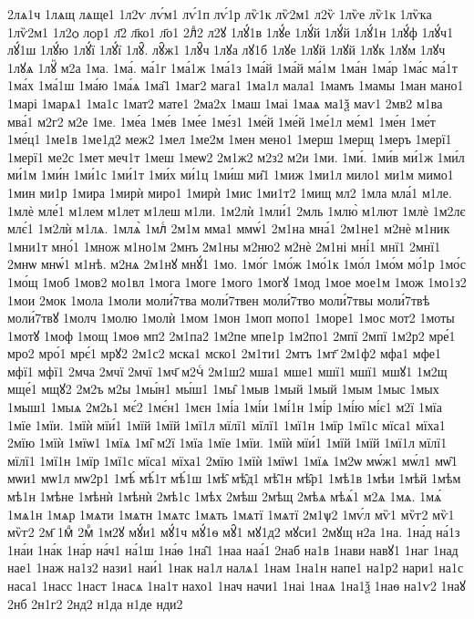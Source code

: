 {2лѧ1ч
1лѧщ
лѧще1
1л2ѵ
лѵ́м1
лѵ́1п
лѵ́1р
лѷ1к
лѷ2м1
л2ѷ
1лѷе
лѷ1к
1лѷка
1лѷ2м1
1л2ѻ
лѻр1
л҃2
л҃ко1
л҃о1
2лⷣ2
л2ꙋ
1лꙋ́1в
1лꙋ́е
1лꙋ́й
1лꙋ́й
1лꙋ́1н
1лꙋ́ф
1лꙋ́ч1
лꙋ́1ш
1лꙋ́ю
1лꙋ́ї
1лꙋ́ї
1лꙋ̑.
лꙋ̑ж1
1лꙋ̑ч
1лꙋа
лꙋ1б
1лꙋе
1лꙋй
1лꙋй
1лꙋк
1лꙋм
1лꙋч
1лꙋѧ
1лꙋⷩ
м2а
1ма.
1ма́.
ма́1г
1ма́1ж
1ма́1з
1ма́й
1ма́й
ма́1м
1ма́н
1ма́р
1ма́с
ма́1т
1ма́х
1ма́1ш
1ма́ю
1ма́ѧ
1ма̑1
1маг2
мага1
1ма1л
мала1
1мамъ
1мамы
1ман
мано1
1марі
1марѧ1
1ма1с
1мат2
мате1
2ма2х
1маш
1маі
1маѧ
ма1ѯ
маѵ1
2мв2
м1ва
мва́1
м2г2
м2е
1ме.
1ме́а
1ме́в
1ме́е
1ме́з1
1ме́й
1ме́й
1ме́1л
ме́м1
1ме́н
1ме́т
1ме́ц1
1ме1в
1ме1д2
меж2
1мел
1ме2м
1мен
мено1
1мерш
1мерщ
1меръ
1мерї1
1мерї1
ме2с
1мет
меч1т
1меш
1меѡ2
2м1ж2
м2з2
м2и
1ми.
1ми́.
1ми́в
ми́1ж
1ми́л
ми́1м
1ми́н
1ми́1с
1ми́1т
1ми́х
ми́1ц
1ми́ш
ми̑1
1миж
1ми1л
мило1
ми1м
мимо1
1мин
ми1р
1мира
1мирѝ
миро1
1мирѝ
1мис
1ми1т2
1мищ
мл2
1мла
мла́1
м1ле.
1млѐ
мле́1
м1лем
м1лет
м1леш
м1ли.
1м2лѝ
1мли́1
2мль
1млю̀
м1лют
1млѐ
1м2лє
млє́1
1м2лѝ
м1лѧ.
1млѧ̀
1млⷭ
2м1м
мма1
ммѡ́1
2м1на
мна́1
2м1не1
м2нѐ
м1ник
1мни1т
мно́1
1множ
м1но1м
2мнъ
2м1ны
м2ню2
м2нѐ
2м1ні
мні́1
мнї1
2мнї1
2мнѡ
мнѡ́1
м1нѣ.
м2нѧ
2м1нꙋ
мнꙋ́1
1мо.
1мо́г
1мо́ж
1мо́1к
1мо́л
1мо́м
мо́1р
1мо́с
1мо́щ
1моб
1мов2
мо1вл
1мога
1моге
1мого
1могꙋ
1мод
1мое
мое1м
1мож
1мо1з2
1мои
2мок
1мола
1моли
моли́7тва
моли́7твен
моли́7тво
моли́7твы
моли́7твѣ
моли́7твꙋ
1молч
1молю
1молѝ
1мом
1мон
1моп
мопо1
1море1
1мос
мот2
1моты
1мотꙋ
1моф
1мощ
1моѳ
мп2
2м1па2
1м2пе
мпе1р
1м2по1
2мпї
2мпї
1м2р2
мре́1
мро2
мро́1
мрє́1
мрꙋ2
2м1с2
мска1
мско1
2м1ти1
2мтъ
1мт҃
2м1ф2
мфа1
мфе1
мфї1
мфї1
2мча
2мчї
2мчї
1мч҃
м2чⷭ
2м1ш2
мша1
мше1
мшї1
мшї1
мшꙋ1
1м2щ
мще́1
мщꙋ2
2м2ъ
м2ы
1мы́н1
мы́ш1
1мы̑
1мыв
1мый
1мый
1мым
1мыс
1мых
1мыш1
1мыѧ
2м2ь1
мє́2
1мє́н1
1мєн
1мі́а
1мі́и
1мі́1н
1мі́р
1мі́ю
мі́є1
м2ї
1мїа
1мїе
1мїи.
1мїѝ
мїи́1
1мїй
1мїй
1мї1л
мїлї1
мїлї1
1мї1н
1мїр
1мї1с
мїса1
мїха1
2мїю
1мїѝ
1мїѡ1
1мїѧ
1мі̑
м2ї
1мїа
1мїе
1мїи.
1мїѝ
мїи́1
1мїй
1мїй
1мї1л
мїлї1
мїлї1
1мї1н
1мїр
1мї1с
мїса1
мїха1
2мїю
1мїѝ
1мїѡ1
1мїѧ
1м2ѡ
мѡ́ж1
мѡ́л1
мѡ̑1
мѡи1
мѡ1л
мѡ2р1
1мѣ́
мѣ́1т
мѣ́1ш
1мѣ̑
мѣ̑д1
мѣ̑1н
мѣ̑р1
1мѣ1в
1мѣи
1мѣй
1мѣм
мѣ1н
1мѣне
1мѣнѝ
1мѣнѝ
2мѣ1с
1мѣх
2мѣш
2мѣщ
2мѣѧ
мѣѧ́1
м2ѧ
1мѧ.
1мѧ́
1мѧ1н
1мѧр
1мѧти
1мѧтн
1мѧтс
1мѧть
1мѧтї
1мѧтї
2м1ѱ2
1мѵ́л
мѷ1
мѷг2
мѷ1
мѷг2
2м҃
1мⷣ
2мⷬ
1м2ꙋ
мꙋ́и1
мꙋ́1ч
мꙋ́1ѳ
мꙋ̑1
мꙋ1д2
мꙋси1
2мꙋщ
н2а
1на.
1на́д
на́1з
1на́и
1на́к
1на́р
на́ч1
на́1ш
1на́ѳ
1на̑1
1наа
наа́1
2наб
на1в
1нави
навꙋ1
1наг
1над
нае1
1наж
на1з2
нази1
наи́1
1нак
на1л
налѧ1
1нам
1на1н
напе1
на1р2
нари1
на1с
наса1
1насс
1наст
1насѧ
1на1т
нахо1
1нач
начи1
1наі
1наѧ
1на1ѯ
1наѳ
на1ѵ2
1наꙋ
2нб
2н1г2
2нд2
н1да
н1де
нди2
}
